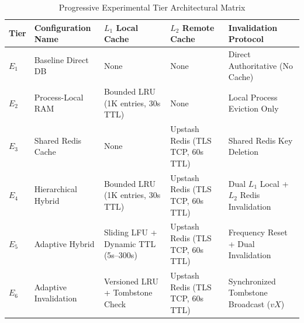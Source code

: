 \documentclass[conference]{IEEEtran}
\begin{document}
\begin{table}[t]
\centering
\caption{Progressive Experimental Tier Architectural Matrix}
\label{tab:tier_specs}
\begin{tabular}{lllll}
\toprule
Tier & Configuration Name & $L_1$ Local Cache & $L_2$ Remote Cache & Invalidation Protocol \\
\midrule
$E_1$ & Baseline Direct DB & None & None & Direct Authoritative (No Cache) \\
$E_2$ & Process-Local RAM & Bounded LRU (1K entries, 30s TTL) & None & Local Process Eviction Only \\
$E_3$ & Shared Redis Cache & None & Upstash Redis (TLS TCP, 60s TTL) & Shared Redis Key Deletion \\
$E_4$ & Hierarchical Hybrid & Bounded LRU (1K entries, 30s TTL) & Upstash Redis (TLS TCP, 60s TTL) & Dual $L_1$ Local + $L_2$ Redis Invalidation \\
$E_5$ & Adaptive Hybrid & Sliding LFU + Dynamic TTL (5s--300s) & Upstash Redis (TLS TCP, 60s TTL) & Frequency Reset + Dual Invalidation \\
$E_6$ & Adaptive Invalidation & Versioned LRU + Tombstone Check & Upstash Redis (TLS TCP, 60s TTL) & Synchronized Tombstone Broadcast ($vX$) \\
\bottomrule
\end{tabular}
\end{table}
\end{document}
